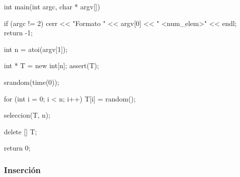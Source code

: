 \documentclass[12pt,spanish]{article}
\begin{document}
\begin{multicols}{2}
\begin{tcblisting}
int main(int argc, char * argv[])
{
  if (argc != 2){
      cerr << "Formato " << argv[0] << " <num_elem>" << endl;
      return -1;
   }

  int n = atoi(argv[1]);

  int * T = new int[n];
  assert(T);

  srandom(time(0));

  for (int i = 0; i < n; i++)
    {
      T[i] = random();
    }

  seleccion(T, n);

  delete [] T;

  return 0;
}
\end{tcblisting}
\end{multicols}
\newpage
\subsubsection{Inserción}
\end{document}
